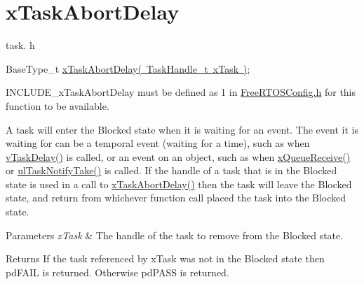 \hypertarget{group__x_task_abort_delay}{}\section{x\+Task\+Abort\+Delay}
\label{group__x_task_abort_delay}
task. h 
\begin{DoxyPre}BaseType\_t \mbox{\hyperlink{task_8h_afefe333df0492c8411c0094badd25185}{xTaskAbortDelay( TaskHandle\_t xTask )}};\end{DoxyPre}


I\+N\+C\+L\+U\+D\+E\+\_\+x\+Task\+Abort\+Delay must be defined as 1 in \mbox{\hyperlink{_free_r_t_o_s_config_8h}{Free\+R\+T\+O\+S\+Config.\+h}} for this function to be available.

A task will enter the Blocked state when it is waiting for an event. The event it is waiting for can be a temporal event (waiting for a time), such as when \mbox{\hyperlink{task_8h_aa154068cecd7f31446a7a84af44ab1a3}{v\+Task\+Delay()}} is called, or an event on an object, such as when \mbox{\hyperlink{queue_8h_ae8364d988c6f9b63c771cc2b3dfe5df9}{x\+Queue\+Receive()}} or \mbox{\hyperlink{task_8h_a66540bef602522a01a519f776e4c07d8}{ul\+Task\+Notify\+Take()}} is called. If the handle of a task that is in the Blocked state is used in a call to \mbox{\hyperlink{task_8h_afefe333df0492c8411c0094badd25185}{x\+Task\+Abort\+Delay()}} then the task will leave the Blocked state, and return from whichever function call placed the task into the Blocked state.


\begin{DoxyParams}{Parameters}
{\em x\+Task} & The handle of the task to remove from the Blocked state.\\
\hline
\end{DoxyParams}
\begin{DoxyReturn}{Returns}
If the task referenced by x\+Task was not in the Blocked state then pd\+F\+A\+IL is returned. Otherwise pd\+P\+A\+SS is returned. 
\end{DoxyReturn}
